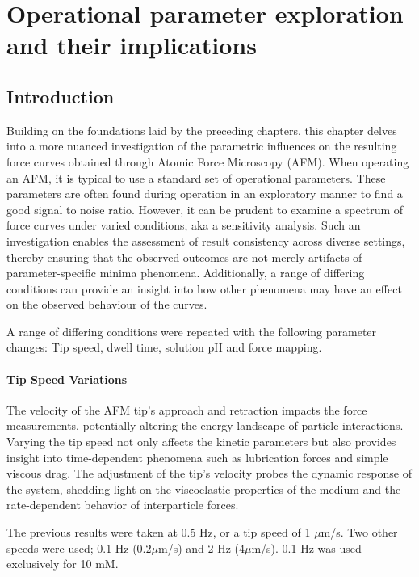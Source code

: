 \chapter{Operational parameter exploration and their implications}

\section{Introduction}

Building on the foundations laid by the preceding chapters, this chapter delves into a more nuanced investigation of the parametric influences on the resulting force curves obtained through Atomic Force Microscopy (AFM). When operating an AFM, it is typical to use a standard set of operational parameters. \cite{Schirmeisen2007} These parameters are often found during operation in an exploratory manner to find a good signal to noise ratio. However, it can be prudent  to examine a spectrum of force curves under varied conditions, aka a sensitivity analysis. Such an investigation enables the assessment of result consistency across diverse settings, thereby ensuring that the observed outcomes are not merely artifacts of parameter-specific minima phenomena. Additionally, a range of differing conditions can provide an insight into how other phenomena may have an effect on the observed behaviour of the curves.

A range of differing conditions were repeated with the following parameter changes: Tip speed, dwell time, solution pH and force mapping. 

\subsubsection{Tip Speed Variations}
The velocity of the AFM tip's approach and retraction impacts the force measurements, potentially altering the energy landscape of particle interactions. Varying the tip speed not only affects the kinetic parameters but also provides insight into time-dependent phenomena such as lubrication forces and simple viscous drag. The adjustment of the tip's velocity probes the dynamic response of the system, shedding light on the viscoelastic properties of the medium and the rate-dependent behavior of interparticle forces.

The previous results were taken at 0.5 Hz, or a tip speed of 1 $\mu$m/s. Two other speeds were used; 0.1 Hz (0.2$\mu$m/s) and 2 Hz (4$\mu$m/s). 0.1 Hz was used exclusively for 10 mM.

